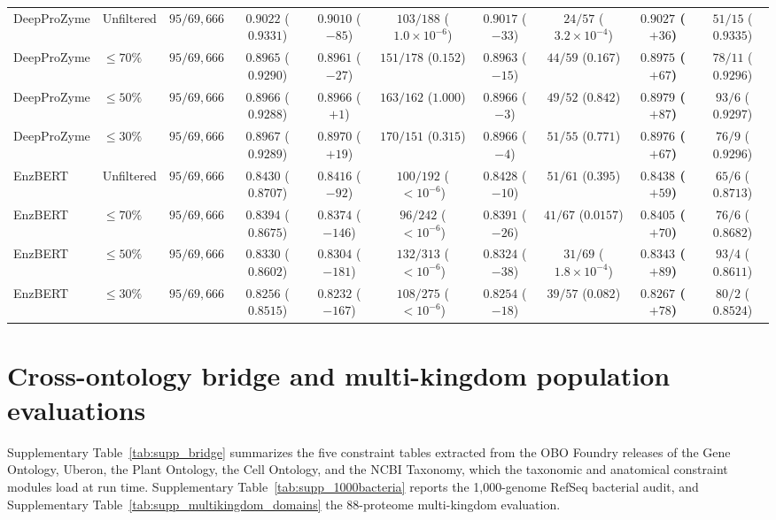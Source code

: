 \documentclass[10pt]{article}
\begin{document}
\begin{table}[h!]
{\begin{tabular}{llcccccccc}
    \midrule
    DeepProZyme & Unfiltered & $95 / 69{,}666$ & $0.9022$ ($0.9331$) & $0.9010$ ($-85$) & $103 / 188$ ($1.0 \times 10^{-6}$) & $0.9017$ ($-33$) & $24 / 57$ ($3.2 \times 10^{-4}$) & \textbf{$0.9027$ ($+36$)} & $51 / 15$ (\textbf{$0.9335$}) \\
    DeepProZyme & $\le 70\%$ & $95 / 69{,}666$ & $0.8965$ ($0.9290$) & $0.8961$ ($-27$) & $151 / 178$ ($0.152$) & $0.8963$ ($-15$) & $44 / 59$ ($0.167$) & \textbf{$0.8975$ ($+67$)} & $78 / 11$ (\textbf{$0.9296$}) \\
    DeepProZyme & $\le 50\%$ & $95 / 69{,}666$ & $0.8966$ ($0.9288$) & $0.8966$ ($+1$) & $163 / 162$ ($1.000$) & $0.8966$ ($-3$) & $49 / 52$ ($0.842$) & \textbf{$0.8979$ ($+87$)} & $93 / 6$ (\textbf{$0.9297$}) \\
    DeepProZyme & $\le 30\%$ & $95 / 69{,}666$ & $0.8967$ ($0.9289$) & $0.8970$ ($+19$) & $170 / 151$ ($0.315$) & $0.8966$ ($-4$) & $51 / 55$ ($0.771$) & \textbf{$0.8976$ ($+67$)} & $76 / 9$ (\textbf{$0.9296$}) \\
    \midrule
    EnzBERT & Unfiltered & $95 / 69{,}666$ & $0.8430$ ($0.8707$) & $0.8416$ ($-92$) & $100 / 192$ ($< 10^{-6}$) & $0.8428$ ($-10$) & $51 / 61$ ($0.395$) & \textbf{$0.8438$ ($+59$)} & $65 / 6$ (\textbf{$0.8713$}) \\
    EnzBERT & $\le 70\%$ & $95 / 69{,}666$ & $0.8394$ ($0.8675$) & $0.8374$ ($-146$) & $96 / 242$ ($< 10^{-6}$) & $0.8391$ ($-26$) & $41 / 67$ ($0.0157$) & \textbf{$0.8405$ ($+70$)} & $76 / 6$ (\textbf{$0.8682$}) \\
    EnzBERT & $\le 50\%$ & $95 / 69{,}666$ & $0.8330$ ($0.8602$) & $0.8304$ ($-181$) & $132 / 313$ ($< 10^{-6}$) & $0.8324$ ($-38$) & $31 / 69$ ($1.8 \times 10^{-4}$) & \textbf{$0.8343$ ($+89$)} & $93 / 4$ (\textbf{$0.8611$}) \\
    EnzBERT & $\le 30\%$ & $95 / 69{,}666$ & $0.8256$ ($0.8515$) & $0.8232$ ($-167$) & $108 / 275$ ($< 10^{-6}$) & $0.8254$ ($-18$) & $39 / 57$ ($0.082$) & \textbf{$0.8267$ ($+78$)} & $80 / 2$ (\textbf{$0.8524$}) \\
    \bottomrule
  \end{tabular}%
  }
\end{table}

\section{Cross-ontology bridge and multi-kingdom population evaluations}
\label{sec:supp_bridge}

Supplementary Table~\ref{tab:supp_bridge} summarizes the five constraint tables extracted from the OBO Foundry releases of the Gene Ontology, Uberon, the Plant Ontology, the Cell Ontology, and the NCBI Taxonomy, which the taxonomic and anatomical constraint modules load at run time. Supplementary Table~\ref{tab:supp_1000bacteria} reports the 1,000-genome RefSeq bacterial audit, and Supplementary Table~\ref{tab:supp_multikingdom_domains} the 88-proteome multi-kingdom evaluation.
\end{document}
